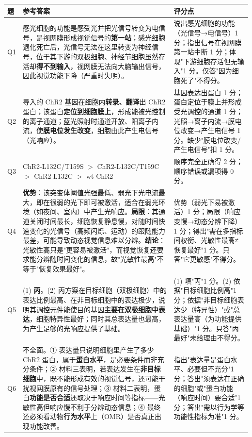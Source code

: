 \documentclass[UTF8,a4paper,11pt]{ctexart}
\begin{document}
\begin{longtable}{@{}p{0.9cm}p{9.6cm}p{4.2cm}@{}}
\toprule
\textbf{题} & \textbf{参考答案} & \textbf{评分点} \\
\midrule
\endhead
Q1 & 感光细胞的功能是感受光并把光信号转变为电信号，是视网膜形成视觉信号的\textbf{第一站}；感光细胞退化死亡后，光信号无法在这里转变为神经信号，位于其下游的双极细胞、神经节细胞虽然存活却\textbf{得不到输入}，视网膜无法向大脑输出信号，因此视觉功能下降（严重时失明）。 & 说出感光细胞的功能（光信号→电信号）1 分；指出信号在视网膜第一站中断 1 分；体现"下游细胞存活但无输入"1 分。仅答"因为细胞死了"不得分。 \\
\addlinespace
Q2 & 导入的 ChR2 基因在细胞内\textbf{转录、翻译}出 ChR2 蛋白；该蛋白\textbf{定位到细胞膜上}，形成能被光控制的离子通道；蓝光照射时通道开放、阳离子内流，使\textbf{膜电位发生改变}，细胞由此产生电信号（光响应）。 & 基因表达出蛋白 1 分；蛋白定位于膜上并形成受光调控的通道 1 分；光照→离子内流→膜电位改变→产生电信号 1 分。缺少"膜电位改变/产生电信号"扣 1 分。 \\
\addlinespace
Q3 & ChR2-L132C/T159S $>$ ChR2-L132C/T159C $>$ ChR2-L132C $>$ wt-ChR2 & 顺序完全正确得 2 分；顺序错误或漏项得 0 分。 \\
\addlinespace
Q4 & \textbf{优势}：该突变体阈值光强最低、弱光下光电流最大，即在很弱的光下即可被激活，适合在弱光环境（如夜间、室内）中产生光响应。\textbf{局限}：其通道关闭时间最长，细胞恢复静息慢，对随时间快速变化的光信号（高频闪烁、运动）的跟随能力最差，可能导致动态视觉信息难以分辨。\textbf{结论}：光敏性高只是"更容易被激活"，而视觉恢复还要求能分辨随时间变化的信息，故"光敏性最高"不等于"恢复效果最好"。 & 优势（弱光下易被激活）1 分；局限（响应变慢→动态分辨下降）1 分；得出"需在多指标间权衡、光敏性最高≠恢复最好"1 分。只答"它更敏感"不得分。 \\
\addlinespace
Q5 & (1) \textbf{丙}。(2) 丙方案在目标细胞（双极细胞）中的表达比例最高、在非目标细胞中的表达极少，说明其调控元件能使目的基因\textbf{主要在双极细胞中表达}，细胞特异性最好；同时其总表达量也最高，为产生足够的光响应提供了基础。 & (1) 填"丙"1 分。(2) 依据"目标细胞比例高"1 分；依据"非目标细胞表达少（特异性）"或"总表达量高（为功能提供基础）"1 分。只答"丙最好"未给理由不得分。 \\
\addlinespace
Q6 & 不全面。① 表达量只说明细胞里产生了多少 ChR2 蛋白，属于\textbf{蛋白水平}，是必要条件而非充分条件；② 材料三表明，若表达发生在\textbf{非目标细胞}中，既不能形成有效的视觉信号，还可能干扰视网膜原有的信号处理；③ 材料二表明，蛋白\textbf{功能是否合适}还取决于响应时间等指标——光敏性高但响应慢不利于分辨动态信息；④ 最终还必须看动物\textbf{行为水平}上（OMR）是否真正出现功能改善。 & 指出"表达量是蛋白水平、必要但不充分"1 分；答出"须表达在正确的细胞"或"蛋白功能（响应时间）要合适"1 分；答出"需以行为学等功能性指标为准"1 分。 \\

\end{longtable}
\end{document}
